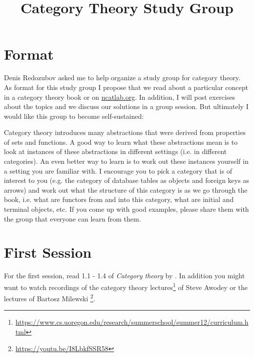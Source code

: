 \documentclass{scrartcl}
\title{Category Theory Study Group}
\date{}
\begin{document}
\maketitle

\section*{Format}
Denis Redozubov asked me to help organize a study group for category theory.
As format for this study group I propose that we read about a particular concept in a category theory book or on \url{ncatlab.org}.
In addition, I will post exercises about the topics and we discuss our solutions in a group session. But ultimately I would like this group to become self-sustained:

Category theory introduces many abstractions that were derived from properties of sets and functions.
A good way to learn what these abstractions mean is to look at instances of these abstractions in different settings (i.e. in different categories).
An even better way to learn is to work out these instances yourself in a setting you are familiar with.
I encourage you to pick a category that is of interest to you (e.g. the category of database tables as objects and foreign keys as arrows) and work out what the structure of this category is as we go through the book, i.e. what are functors from and into this category, what are initial and terminal objects, etc.
If you come up with good examples, please share them with the group that everyone can learn from them.

\section*{First Session}
For the first session, read 1.1 - 1.4 of \emph{Category theory} by \cite{awodey2010category}. In addition you might want to watch recordings of the category theory lectures\footnote{\url{https://www.cs.uoregon.edu/research/summerschool/summer12/curriculum.html}} of Steve Awodey or the lectures of Bartosz Milewski \footnote{\url{https://youtu.be/I8LbkfSSR58}}.
\end{document}
